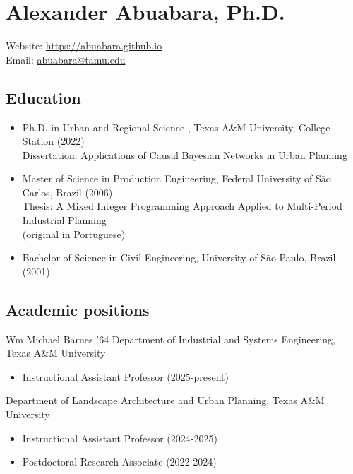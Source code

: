 \documentclass[11pt]{article}
\begin{document}
\raggedright

\section*{Alexander Abuabara, Ph.D.}
Website: \url{https://abuabara.github.io}\\[1pt]
Email: \href{mailto:abuabara@tamu.edu}{abuabara@tamu.edu}

\subsection*{Education}
\begin{itemize}[leftmargin=20pt]
\item Ph.D. in Urban and Regional Science , Texas A\&M University, College Station (2022)\\[1pt]
      Dissertation: Applications of Causal Bayesian Networks in Urban Planning
\item Master of Science in Production Engineering, Federal University of São Carlos, Brazil (2006)\\[1pt]
      Thesis: A Mixed Integer Programming Approach Applied to Multi-Period Industrial Planning\\
      {\small (original in Portuguese)}
\item Bachelor of Science in Civil Engineering, University of São Paulo, Brazil (2001)
\end{itemize}

\subsection*{Academic positions}
Wm Michael Barnes ’64 Department of Industrial and Systems Engineering, Texas A\&M University
\begin{itemize}[leftmargin=20pt]
\item Instructional Assistant Professor (2025-present)
\end{itemize}

\vspace{3pt}

Department of Landscape Architecture and Urban Planning, Texas A\&M University
\begin{itemize}[leftmargin=20pt]
\item Instructional Assistant Professor (2024-2025)
\item Postdoctoral Research Associate (2022-2024)
\end{itemize}
\end{document}
